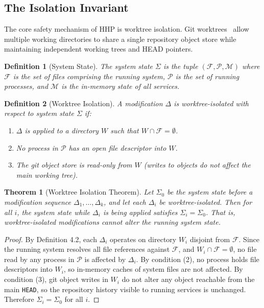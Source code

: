 \documentclass[11pt]{article}
\newtheorem{theorem}{Theorem}
\newtheorem{definition}{Definition}
\begin{document}
\subsection{The Isolation Invariant}
\label{sec:isolation}

The core safety mechanism of HHP is worktree isolation. Git worktrees~\cite{git2015worktree}
allow multiple working directories to share a single repository object store
while maintaining independent working trees and HEAD pointers.

\begin{definition}[System State]
The \emph{system state} $\Sigma$ is the tuple $(\mathcal{F}, \mathcal{P}, \mathcal{M})$
where $\mathcal{F}$ is the set of files comprising the running system,
$\mathcal{P}$ is the set of running processes, and $\mathcal{M}$ is the in-memory
state of all services.
\end{definition}

\begin{definition}[Worktree Isolation]
\label{def:isolation}
A modification $\Delta$ is \emph{worktree-isolated} with respect to system state
$\Sigma$ if:
\begin{enumerate}[leftmargin=1.5em]
    \item $\Delta$ is applied to a directory $W$ such that $W \cap \mathcal{F} = \emptyset$.
    \item No process in $\mathcal{P}$ has an open file descriptor into $W$.
    \item The git object store is read-only from $W$ (writes to objects do not
          affect the main working tree).
\end{enumerate}
\end{definition}

\begin{theorem}[Worktree Isolation Theorem]
\label{thm:isolation}
Let $\Sigma_0$ be the system state before a modification sequence
$\Delta_1, \ldots, \Delta_k$, and let each $\Delta_i$ be worktree-isolated.
Then for all $i$, the system state while $\Delta_i$ is being applied satisfies
$\Sigma_i = \Sigma_0$. That is, worktree-isolated modifications cannot alter
the running system state.
\end{theorem}

\begin{proof}
By Definition 4.2, each $\Delta_i$ operates on directory $W_i$ disjoint from
$\mathcal{F}$. Since the running system resolves all file references against
$\mathcal{F}$, and $W_i \cap \mathcal{F} = \emptyset$, no file read by any
process in $\mathcal{P}$ is affected by $\Delta_i$. By condition (2), no process
holds file descriptors into $W_i$, so in-memory caches of system files are not
affected. By condition (3), git object writes in $W_i$ do not alter any object
reachable from the main \texttt{HEAD}, so the repository history visible to
running services is unchanged. Therefore $\Sigma_i = \Sigma_0$ for all $i$.
\end{proof}
\end{document}
